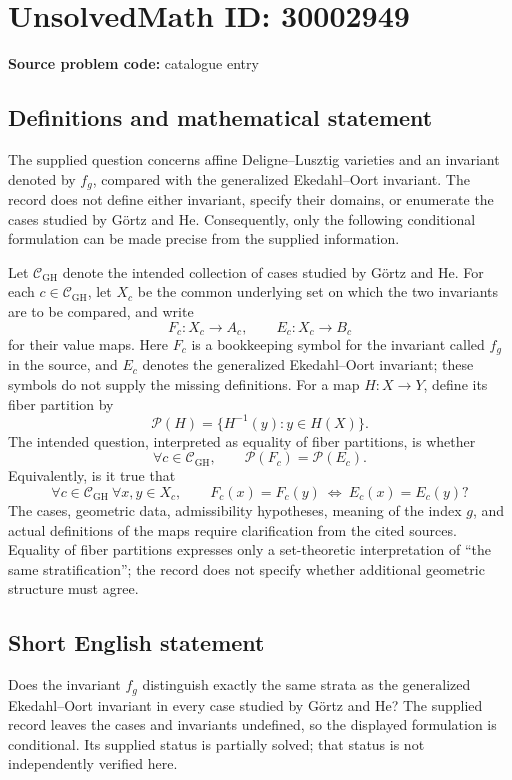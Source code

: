 \documentclass[11pt]{article}
\begin{document}
\section*{UnsolvedMath ID: 30002949}
\textbf{Source problem code:} catalogue entry
\subsection{Definitions and mathematical statement}
The supplied question concerns affine Deligne--Lusztig varieties and an invariant denoted by \(f_g\), compared with the generalized Ekedahl--Oort invariant. The record does not define either invariant, specify their domains, or enumerate the cases studied by Görtz and He. Consequently, only the following conditional formulation can be made precise from the supplied information.

Let \(\mathcal C_{\mathrm{GH}}\) denote the intended collection of cases studied by Görtz and He. For each \(c\in\mathcal C_{\mathrm{GH}}\), let \(X_c\) be the common underlying set on which the two invariants are to be compared, and write
\[
F_c:X_c\longrightarrow A_c,\qquad E_c:X_c\longrightarrow B_c
\]
for their value maps. Here \(F_c\) is a bookkeeping symbol for the invariant called \(f_g\) in the source, and \(E_c\) denotes the generalized Ekedahl--Oort invariant; these symbols do not supply the missing definitions. For a map \(H:X\to Y\), define its fiber partition by
\[
\mathcal P(H)=\{H^{-1}(y):y\in H(X)\}.
\]
The intended question, interpreted as equality of fiber partitions, is whether
\[
\forall c\in\mathcal C_{\mathrm{GH}},\qquad \mathcal P(F_c)=\mathcal P(E_c).
\]
Equivalently, is it true that
\[
\forall c\in\mathcal C_{\mathrm{GH}}\ \forall x,y\in X_c,\qquad
F_c(x)=F_c(y)\ \Longleftrightarrow\ E_c(x)=E_c(y)?
\]
The cases, geometric data, admissibility hypotheses, meaning of the index \(g\), and actual definitions of the maps require clarification from the cited sources. Equality of fiber partitions expresses only a set-theoretic interpretation of ``the same stratification''; the record does not specify whether additional geometric structure must agree.
\subsection{Short English statement}
Does the invariant \(f_g\) distinguish exactly the same strata as the generalized Ekedahl--Oort invariant in every case studied by Görtz and He? The supplied record leaves the cases and invariants undefined, so the displayed formulation is conditional. Its supplied status is partially solved; that status is not independently verified here.
\end{document}
